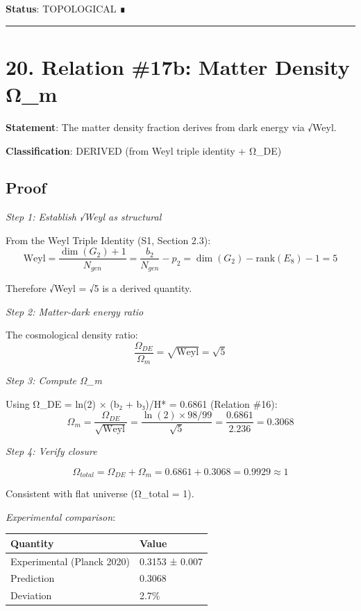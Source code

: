 \documentclass[11pt,a4paper]{article}
\begin{document}
\textbf{Status}: TOPOLOGICAL ∎

\begin{center}\rule{\linewidth}{0.5pt}\end{center}

\section{20. Relation \#17b: Matter Density Ω\_\allowbreak{}m}\label{relation-17b-matter-density-ux3c9_m}

\textbf{Statement}: The matter density fraction derives from dark energy via √Weyl.

\textbf{Classification}: DERIVED (from Weyl triple identity + Ω\_\allowbreak{}DE)

\subsection{Proof}\label{proof-27}

\emph{Step 1: Establish √Weyl as structural}

From the Weyl Triple Identity (S1, Section 2.3): \[\text{Weyl} = \frac{\dim(G_2) + 1}{N_{gen}} = \frac{b_2}{N_{gen}} - p_2 = \dim(G_2) - \text{rank}(E_8) - 1 = 5\]

Therefore √Weyl = √5 is a derived quantity.

\emph{Step 2: Matter-dark energy ratio}

The cosmological density ratio: \[\frac{\Omega_{DE}}{\Omega_m} = \sqrt{\text{Weyl}} = \sqrt{5}\]

\emph{Step 3: Compute Ω\_\allowbreak{}m}

Using Ω\_\allowbreak{}DE = ln(2) × (b₂ + b₃)/H* = 0.6861 (Relation \#16): \[\Omega_m = \frac{\Omega_{DE}}{\sqrt{\text{Weyl}}} = \frac{\ln(2) \times 98/99}{\sqrt{5}} = \frac{0.6861}{2.236} = 0.3068\]

\emph{Step 4: Verify closure}

\[\Omega_{total} = \Omega_{DE} + \Omega_m = 0.6861 + 0.3068 = 0.9929 \approx 1\]

Consistent with flat universe (Ω\_\allowbreak{}total = 1).

\emph{Experimental comparison}:

\begin{longtable}[]{@{}ll@{}}
\toprule\noalign{}
Quantity & Value \\
\midrule\noalign{}
\endhead
\bottomrule\noalign{}
\endlastfoot
Experimental (Planck 2020) & 0.3153 ± 0.007 \\
Prediction & 0.3068 \\
Deviation & 2.7\% \\
\end{longtable}
\end{document}
